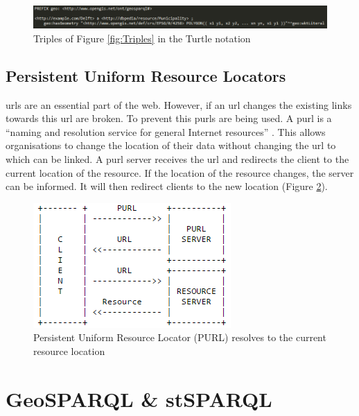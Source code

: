 \begin{figure}
	\centering
	\includegraphics[width=1\linewidth]{figs/Turtle.png}
	\caption{Triples of Figure \ref{fig:Triples} in the Turtle notation}
	\label{fig:Turtle}
\end{figure} 

\subsection{Persistent Uniform Resource Locators}
\acp{url} are an essential part of the web. However, if an \ac{url} changes the existing links towards this \ac{url} are broken. To prevent this \acp{purl} are being used. A \acl{purl} is a \enquote{naming and resolution service for general Internet resources} \citep{LD:PURL}. This allows organisations to change the location of their data without changing the \ac{url} to which can be linked. A \ac{purl} server receives the \ac{url} and redirects the client to the current location of the resource. If the location of the resource 
changes, the server can be informed. It will then redirect clients to the new location (Figure \ref{fig:PURL}).  

\begin{figure}
	\centering
	\includegraphics[width=0.6\linewidth]{figs/purl.png}
	\caption{Persistent Uniform Resource Locator (PURL) resolves to the current resource location \citep{LD:PURL}}
	\label{fig:PURL}
\end{figure} 

\section{GeoSPARQL \& stSPARQL}

